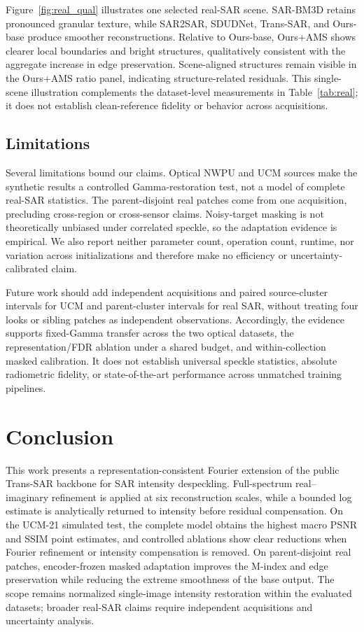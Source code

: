 \documentclass[conference]{IEEEtran}
\begin{document}
Figure~\ref{fig:real_qual} illustrates one selected real-SAR scene. SAR-BM3D retains pronounced granular texture, while SAR2SAR, SDUDNet, Trans-SAR, and Ours-base produce smoother reconstructions. Relative to Ours-base, Ours+AMS shows clearer local boundaries and bright structures, qualitatively consistent with the aggregate increase in edge preservation. Scene-aligned structures remain visible in the Ours+AMS ratio panel, indicating structure-related residuals. This single-scene illustration complements the dataset-level measurements in Table~\ref{tab:real}; it does not establish clean-reference fidelity or behavior across acquisitions.

\subsection{Limitations}
Several limitations bound our claims. Optical NWPU and UCM sources make the synthetic results a controlled Gamma-restoration test, not a model of complete real-SAR statistics. The parent-disjoint real patches come from one acquisition, precluding cross-region or cross-sensor claims. Noisy-target masking is not theoretically unbiased under correlated speckle, so the adaptation evidence is empirical. We also report neither parameter count, operation count, runtime, nor variation across initializations and therefore make no efficiency or uncertainty-calibrated claim.

Future work should add independent acquisitions and paired source-cluster intervals for UCM and parent-cluster intervals for real SAR, without treating four looks or sibling patches as independent observations. Accordingly, the evidence supports fixed-Gamma transfer across the two optical datasets, the representation/FDR ablation under a shared budget, and within-collection masked calibration. It does not establish universal speckle statistics, absolute radiometric fidelity, or state-of-the-art performance across unmatched training pipelines.

\section{Conclusion}
This work presents a representation-consistent Fourier extension of the public Trans-SAR backbone for SAR intensity despeckling. Full-spectrum real--imaginary refinement is applied at six reconstruction scales, while a bounded log estimate is analytically returned to intensity before residual compensation. On the UCM-21 simulated test, the complete model obtains the highest macro PSNR and SSIM point estimates, and controlled ablations show clear reductions when Fourier refinement or intensity compensation is removed. On parent-disjoint real patches, encoder-frozen masked adaptation improves the M-index and edge preservation while reducing the extreme smoothness of the base output. The scope remains normalized single-image intensity restoration within the evaluated datasets; broader real-SAR claims require independent acquisitions and uncertainty analysis.
\end{document}
